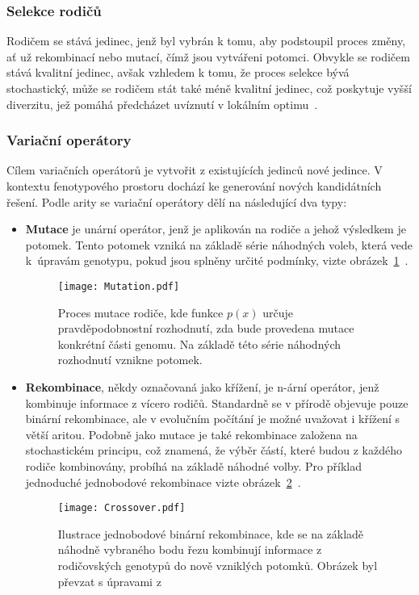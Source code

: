 \subsubsection*{Selekce rodičů}
Rodičem se stává jedinec, jenž byl vybrán k tomu, aby podstoupil proces změny, ať už rekombinací nebo mutací, čímž jsou vytvářeni potomci. 
Obvykle se rodičem stává kvalitní jedinec, avšak vzhledem k tomu, že proces selekce bývá stochastický, může se rodičem stát také méně kvalitní jedinec, což poskytuje vyšší diverzitu, jež pomáhá předcházet uvíznutí v lokálním optimu~\cite{IntroductionToEvoComputing}. 

\subsubsection*{Variační operátory}
Cílem variačních operátorů je vytvořit z existujících jedinců nové jedince. 
V kontextu fenotypového prostoru dochází ke generování nových kandidátních řešení. 
Podle arity se variační operátory dělí na následující dva typy:
\begin{itemize}
    \item \textbf{Mutace} je unární operátor, jenž je aplikován na rodiče a jehož výsledkem je potomek. 
        Tento potomek vzniká na základě série náhodných voleb, která vede k~úpravám genotypu, pokud jsou splněny určité podmínky, vizte obrázek~\ref{fig:mutation}~\cite{IntroductionToEvoComputing,NaturalComputing}. 
        \begin{figure}[ht!]
            \centering
            \texttt{[image: Mutation.pdf]}
            \caption{Proces mutace rodiče, kde funkce $p\left(x\right)$ určuje pravděpodobnostní rozhodnutí, zda bude provedena mutace konkrétní části genomu. Na základě této série náhodných rozhodnutí vznikne potomek.}
            \label{fig:mutation}
        \end{figure}
    \item \textbf{Rekombinace}, někdy označovaná jako křížení, je n-ární operátor, jenž kombinuje informace z vícero rodičů. 
        Standardně se v přírodě objevuje pouze binární rekombinace, ale v evolučním počítání je možné uvažovat i křížení s větší aritou. 
        Podobně jako mutace je také rekombinace založena na stochastickém principu, což znamená, že výběr částí, které budou z každého rodiče kombinovány, probíhá na základě náhodné volby. 
        Pro příklad jednoduché jednobodové rekombinace vizte obrázek~\ref{fig:crossover}~\cite{IntroductionToEvoComputing}. 
        \begin{figure}[ht!]
            \centering
            \texttt{[image: Crossover.pdf]}
            \caption{Ilustrace jednobodové binární rekombinace, kde se na základě náhodně vybraného bodu řezu kombinují informace z rodičovských genotypů do nově vzniklých potomků. Obrázek byl převzat s úpravami z~\cite{NaturalComputing}}
            \label{fig:crossover}
        \end{figure}
\end{itemize}
